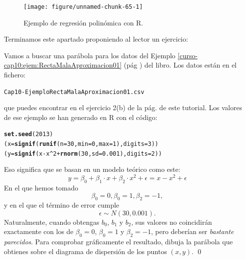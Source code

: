 \documentclass[10pt,a4paper]{article}\usepackage[]{graphicx}\usepackage[]{color}
\makeatletter
\newcommand{\hlnum}[1]{\textcolor[rgb]{0.686,0.059,0.569}{#1}}%
\newcommand{\hlopt}[1]{\textcolor[rgb]{0,0,0}{#1}}%
\newcommand{\hlstd}[1]{\textcolor[rgb]{0.345,0.345,0.345}{#1}}%
\newcommand{\hlkwb}[1]{\textcolor[rgb]{0.69,0.353,0.396}{#1}}%
\newcommand{\hlkwc}[1]{\textcolor[rgb]{0.333,0.667,0.333}{#1}}%
\newcommand{\hlkwd}[1]{\textcolor[rgb]{0.737,0.353,0.396}{\textbf{#1}}}%
\newenvironment{kframe}{%
 \def\at@end@of@kframe{}%
 \ifinner\ifhmode%
  \def\at@end@of@kframe{\end{minipage}}%
  \begin{minipage}{\columnwidth}%
 \fi\fi%
 \def\FrameCommand##1{\hskip\@totalleftmargin \hskip-\fboxsep
 \colorbox{shadecolor}{##1}\hskip-\fboxsep
     \hskip-\linewidth \hskip-\@totalleftmargin \hskip\columnwidth}%
 \MakeFramed {\advance\hsize-\width
   \@totalleftmargin\z@ \linewidth\hsize
   \@setminipage}}%
 {\par\unskip\endMakeFramed%
 \at@end@of@kframe}
\newenvironment{knitrout}{}{} %
\newcounter {cont01}
\makeatother
\begin{document}
\begin{figure}[b!]
\begin{center}
\begin{knitrout}
\color{fgcolor}
\texttt{[image: figure/unnamed-chunk-65-1]} 

\end{knitrout}
\end{center}
\caption{Ejemplo de regresión polinómica con R.}
\label{tut10:fig:RegresionPolinomica}
\end{figure}

Terminamos este apartado proponiendo al lector un ejercicio:
\begin{ejercicio}
\label{tut10:ejercicio10}
Vamos a buscar una parábola para los datos del Ejemplo \ref{curso-cap10:ejem:RectaMalaAproximacion01} (pág \pageref{curso-cap10:ejem:RectaMalaAproximacion01}) del libro. Los datos están en el fichero:
\begin{center}
{\tt Cap10-EjemploRectaMalaAproximacion01.csv}
\end{center}
que puedes encontrar en el ejercicio 2(b) de la pág. \pageref{tut10:ejercicio03} de este tutorial. Los valores de ese ejemplo se han generado en R con el código:
\begin{knitrout}
\color{fgcolor}\begin{kframe}
\begin{alltt}
\hlkwd{set.seed}\hlstd{(}\hlnum{2013}\hlstd{)}
\hlstd{(x} \hlkwb{=} \hlkwd{signif}\hlstd{(}\hlkwd{runif}\hlstd{(}\hlkwc{n}\hlstd{=}\hlnum{30}\hlstd{,} \hlkwc{min}\hlstd{=}\hlnum{0}\hlstd{,} \hlkwc{max}\hlstd{=}\hlnum{1} \hlstd{),} \hlkwc{digits}\hlstd{=}\hlnum{3}\hlstd{) )}
\hlstd{(y} \hlkwb{=} \hlkwd{signif}\hlstd{(x}\hlopt{-}\hlstd{x}\hlopt{^}\hlnum{2}\hlopt{+}\hlkwd{rnorm}\hlstd{(}\hlnum{30}\hlstd{,}\hlkwc{sd}\hlstd{=}\hlnum{0.001}\hlstd{),}\hlkwc{digits}\hlstd{=}\hlnum{2} \hlstd{) )}
\end{alltt}
\end{kframe}
\end{knitrout}
Eso significa que se basan en un modelo teórico como este:
\[y=\beta_0+\beta_1\cdot x+\beta_2\cdot x^2+\epsilon=x-x^2+\epsilon\]
En el que hemos tomado
\[\beta_0=0, \beta_0=1, \beta_2=-1,\]
y en el que el término de error cumple
\[\epsilon\sim N(30,0.001).\]
Naturalmente, cuando obtengas $b_0$, $b_1$ y $b_2$, sus valores no coincidirán exactamente con los de $\beta_0=0$, $\beta_0=1$ y $\beta_2=-1$, pero deberían ser {\em bastante parecidos}. Para comprobar gráficamente el resultado, dibuja la parábola que obtienes sobre el diagrama de dispersión de los puntos $(x,y)$.
\qed
\end{ejercicio}
\end{document}
